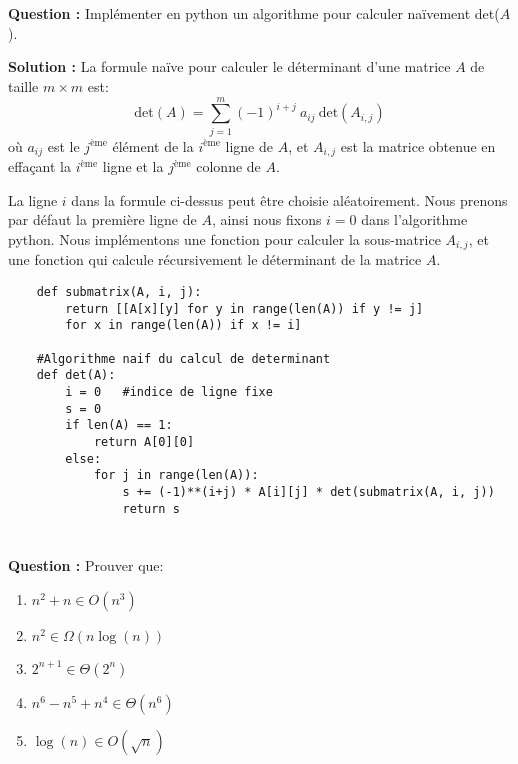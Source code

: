 \documentclass[11pt]{article} %
\newenvironment{question}[1][\unskip]{%
	\par
	\noindent
	\textbf{Question #1:}
	\noindent}
{\medskip}
\newenvironment{solution}[1][\unskip]{%
	\par
	\noindent
	\textbf{Solution #1:}
	\noindent}
{\medskip}
\begin{document}
\section{}

\begin{question}
	Implémenter en python un algorithme pour calculer naïvement det($A$).
\end{question}

\begin{solution}
	La formule naïve pour calculer le déterminant d'une matrice $A$ de taille $m\times m$ est:
	\begin{equation*}
	\text{det}(A)=\sum_{j=1}^m (-1)^{i+j} \ a_{ij} \ \text{det}(A_{i,j})
	\end{equation*} 
	où $a_{ij}$ est le $j^{\text{ème}}$ élément de la $i^{\text{ème}}$ ligne de $A$, et $A_{i,j}$ est la matrice obtenue en effaçant la $i^{\text{ème}}$ ligne et la $j^{\text{ème}}$ colonne de $A$.
	
	La ligne $i$ dans la formule ci-dessus peut être choisie aléatoirement. Nous prenons par défaut la première ligne de $A$, ainsi nous fixons $i=0$ dans l'algorithme python. Nous implémentons une fonction pour calculer la sous-matrice $A_{i,j}$, et une fonction qui calcule récursivement le déterminant de la matrice $A$.
	\begin{lstlisting}
	def submatrix(A, i, j):
		return [[A[x][y] for y in range(len(A)) if y != j]
		for x in range(len(A)) if x != i]
	
	#Algorithme naif du calcul de determinant
	def det(A):
		i = 0   #indice de ligne fixe
		s = 0	
		if len(A) == 1:
			return A[0][0]
		else:
			for j in range(len(A)):
				s += (-1)**(i+j) * A[i][j] * det(submatrix(A, i, j))	
				return s
	\end{lstlisting}
\end{solution}

\section{}

\begin{question}
	Prouver que:
	\begin{enumerate}
		\item {$n^2+n \in O(n^3)$}
		\item {$n^2 \in \Omega(n\log(n))$}
		\item {$2^{n+1} \in \Theta(2^n)$}
		\item {$n^6-n^5+n^4 \in \Theta(n^6)$}
		\item {$\log(n) \in O(\sqrt{n})$}
	\end{enumerate}
\end{question}
\end{document}
